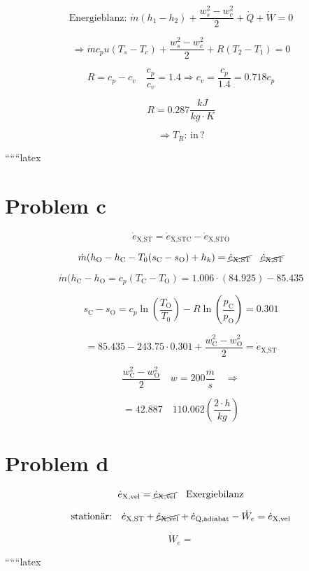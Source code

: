 \[
\text{Energieblanz: } \dot{m} (h_1 - h_2) + \frac{w_s^2 - w_c^2}{2} + \dot{Q} + \dot{W} = 0
\]

\[
\Rightarrow \dot{m} c_p u (T_s - T_c) + \frac{w_s^2 - w_c^2}{2} + R(T_2 - T_1) = 0
\]

\[
R = c_p - c_v \quad \frac{c_p}{c_v} = 1.4 \Rightarrow c_v = \frac{c_p}{1.4} = 0.718 c_p
\]

\[
R = 0.287 \frac{kJ}{kg \cdot K}
\]

\[
\Rightarrow T_R: \, \text{in} \, ?
\]

``````latex

\section*{Problem c}

\[
\dot{e}_{\text{X,ST}} = \dot{e}_{\text{X,STC}} - \dot{e}_{\text{X,STO}}
\]

\[
\dot{m} (h_{\text{O}} - h_{\text{C}} - T_0 (s_{\text{C}} - s_{\text{O}}) + h_k) = \cancel{\dot{e}_{\text{X,ST}}} \quad \cancel{\dot{e}_{\text{X,ST}}}
\]

\[
\dot{m} (h_{\text{C}} - h_{\text{O}} = c_p (T_{\text{C}} - T_{\text{O}}) = 1.006 \cdot (84.925) - 85.435
\]

\[
s_{\text{C}} - s_{\text{O}} = c_p \ln \left( \frac{T_{\text{O}}}{T_0} \right) - R \ln \left( \frac{p_{\text{C}}}{p_{\text{O}}} \right) = 0.301
\]

\[
= 85.435 - 243.75 \cdot 0.301 + \frac{w_{\text{C}}^2 - w_{\text{O}}^2}{2} = \dot{e}_{\text{X,ST}}
\]

\[
\frac{w_{\text{C}}^2 - w_{\text{O}}^2}{2} \quad w = 200 \frac{m}{s} \quad \Rightarrow
\]

\[
= 42.887 \quad 110.062 \left( \frac{2 \cdot h}{kg} \right)
\]

\section*{Problem d}

\[
\dot{e}_{\text{X,vel}} = \cancel{\dot{e}_{\text{X,vel}}} \quad \text{Exergiebilanz}
\]

\[
\text{stationär:} \quad \dot{e}_{\text{X,ST}} + \cancel{\dot{e}_{\text{X,vel}}} + \dot{e}_{\text{Q,adiabat}} - \dot{W}_e = \dot{e}_{\text{X,vel}}
\]

\[
\dot{W}_e =
\]

``````latex



